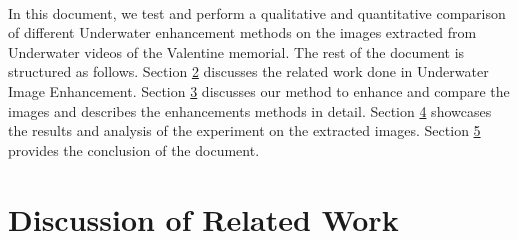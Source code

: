 \documentclass[a4paper,11pt,oneside]{article}
\begin{document}
  \\
In this document, we test and perform a qualitative and quantitative comparison of different Underwater enhancement methods on the images extracted from Underwater videos of the Valentine memorial. The rest of the document is structured as follows. Section \hyperref[sec:2]{2} discusses the related work done in Underwater Image Enhancement. Section \hyperref[sec:3]{3} discusses our method to enhance and compare the images and describes the enhancements methods in detail. Section \hyperref[sec:4]{4} showcases the results and analysis of the experiment on the extracted images. Section \hyperref[sec:5]{5} provides the conclusion of the document.  

  \section{Discussion of Related Work}
  \label{sec:2}

\end{document}
